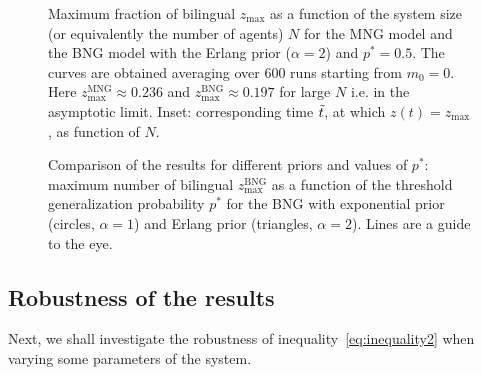 \documentclass[review]{elsarticle}
\newcommand{\zmax}{z_\mathrm{max}}
\newcommand{\Tt}{\Tilde{t}}
\newcommand{\+}{\! + \!}
\begin{document}
 
 
\begin{figure}[ht!]
\caption{
Maximum fraction of bilingual $\zmax$ as a function of the system size (or equivalently the number of agents) $N$ for the MNG model and the BNG model with the Erlang prior ($\alpha=2$) and  $ p^*= 0.5$. 
The curves are obtained averaging over $600$ runs starting from $m_0=0$.
Here $\zmax^\mathrm{MNG}  \approx 0.236$ and  $\zmax^\mathrm{BNG}  \approx 0.197$ for large $N$ i.e. in the asymptotic limit. 
Inset: corresponding time $\Tt$, at which $z(t) = \zmax$, as function of $N$. 
}
\label{fig:maxima}       
\end{figure}


\begin{figure}[ht!]
\caption{
Comparison of the results for different priors and values of $p^*$: maximum number of bilingual $\zmax^\mathrm{BNG}$  as a function of the threshold generalization probability $p^*$ for the BNG with exponential prior (circles, $\alpha=1$) and Erlang prior (triangles, $\alpha=2$).
Lines are a guide to the eye.}
\label{fig:generalizationBoundary}      
\end{figure}







\subsection{Robustness of the results}
\label{sec:robust}




Next, we shall investigate the robustness of inequality~\eqref{eq:inequality2} when varying some parameters of the system.
\end{document}
